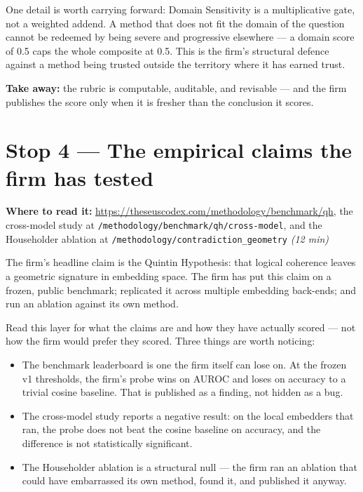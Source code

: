 \documentclass[11pt,letterpaper]{article}
\newcommand{\surface}[1]{\texttt{#1}}
\newcommand{\rt}[1]{\textsl{#1}}
\begin{document}
One detail is worth carrying forward: Domain Sensitivity is a multiplicative gate, not a weighted addend. A method that does not fit the domain of the question cannot be redeemed by being severe and progressive elsewhere --- a domain score of 0.5 caps the whole composite at 0.5. This is the firm's structural defence against a method being trusted outside the territory where it has earned trust.

\textbf{Take away:} the rubric is computable, auditable, and revisable --- and the firm publishes the score only when it is fresher than the conclusion it scores.

\section{Stop 4 --- The empirical claims the firm has tested}

\textbf{Where to read it:} \url{https://theseuscodex.com/methodology/benchmark/qh}, the cross-model study at \surface{/methodology/benchmark/qh/cross-model}, and the Householder ablation at \surface{/methodology/contradiction\_geometry} \quad \rt{(12 min)}

\medskip

The firm's headline claim is the Quintin Hypothesis: that logical coherence leaves a geometric signature in embedding space. The firm has put this claim on a frozen, public benchmark; replicated it across multiple embedding back-ends; and run an ablation against its own method.

Read this layer for what the claims are and how they have actually scored --- not how the firm would prefer they scored. Three things are worth noticing:

\begin{itemize}[leftmargin=*,itemsep=0.25em]
  \item The benchmark leaderboard is one the firm itself can lose on. At the frozen v1 thresholds, the firm's probe wins on AUROC and loses on accuracy to a trivial cosine baseline. That is published as a finding, not hidden as a bug.
  \item The cross-model study reports a negative result: on the local embedders that ran, the probe does not beat the cosine baseline on accuracy, and the difference is not statistically significant.
  \item The Householder ablation is a structural null --- the firm ran an ablation that could have embarrassed its own method, found it, and published it anyway.
\end{itemize}
\end{document}
